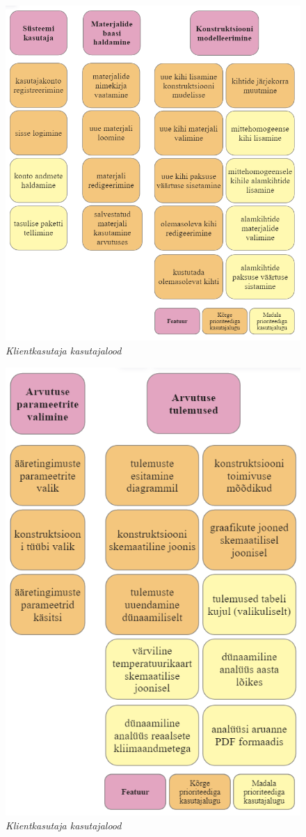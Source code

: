 \begin{figure}[ht]
    \centering
    \includegraphics[width=.9\textwidth]{figures/analysis/client_userstories1.png}
    \caption[Kasutajalood: klientkasutaja, 1. osa]{\textit{Klientkasutaja kasutajalood}}
    \label{fig:userstories1}
\end{figure}
\begin{figure}[ht]
    \centering
    \includegraphics[width=.7\textwidth]{figures/analysis/client_userstories2.png}
    \caption[Kasutajalood: klientkasutaja, 2. osa]{\textit{Klientkasutaja kasutajalood}}
    \label{fig:userstories2}
\end{figure}
